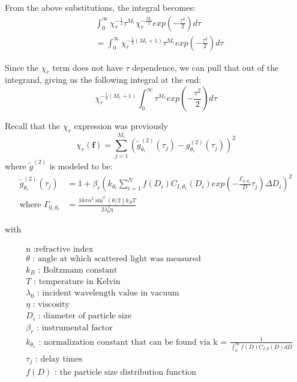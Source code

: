 \documentclass[11pt]{article}
\begin{document}
 From the above substitutions, the integral becomes:
\begin{equation}
\begin{split}
 & \int_{0}^{\infty}\chi_r^{-\frac{1}{2}} \tau^{M_r} \chi_r^{-\frac{M_r}{2}} exp\left( -\frac{\tau^2}{2} \right) d\tau \\
& = \int_{0}^{\infty} \chi_r^{-\frac{1}{2}(M_r + 1)} \tau^{M_r} exp\left( -\frac{\tau^2}{2} \right) d\tau
\end{split}
\end{equation}

Since the $\chi_r$ term does not have $\tau$ dependence, we can pull that out of the integrand, giving us the following integral at the end:
\begin{equation}
\chi_r^{-\frac{1}{2}(M_r + 1) }\int_{0}^{\infty}\tau^{M_r}exp\left( -\frac{\tau^2}{2} \right) d\tau
\end{equation}

Recall that the $\chi_r$ expression was previously 
\begin{equation}
\chi_r(\mathbf{f}) = \sum_{j=1}^{M_r} {\left( \tilde{g}^{(2)}_{\theta_r} (\tau_j) - g^{(2)}_{\theta_r}(\tau_j) \right)}^2
\end{equation}
where $\tilde{g}^{(2)}$ is modeled to be:
\begin{equation}
\begin{split}
 \tilde{g}^{(2)}_{\theta_r} (\tau_j) & = 1 + \beta_r {\left( k_{\theta_r}\sum_{i=1}^{N}f(D_i) C_{I,\theta_r}(D_i) exp\left( -\frac{\Gamma_{0,\theta_r}}{D} \tau_j \right) \Delta D_i \right)}^2 \\
\text{where } \Gamma_{0,\theta_r} & = \frac{16\pi n^2 \sin^2(\theta/2)k_B T}{2\lambda_0^2\eta}
 \end{split}
\end{equation}

with 

\begin{equation}
\begin{split}
& \text{n } : \text{refractive index}\\
& \theta\text{ : angle at which scattered light was measured}\\
& k_B\text{ : Boltzmann constant} \\
& T\text{ : temperature in Kelvin} \\
& \lambda_0\text{ : incident wavelength value in vacuum}\\
& \eta\text{ : viscosity} \\
& D_i\text{ : diameter of particle size}\\
& \beta_r\text{ : instrumental factor}\\
& k_{\theta_r}\text{ : normalization constant that can be found via k = }\frac{1}{\int_{0}^{\infty} f(D)C_{I,\theta}(D) dD}\\
&\tau_j\text{ : delay times} \\
&f(D)\text{ : the particle size distribution function}
\end{split}
\end{equation}
\end{document}
